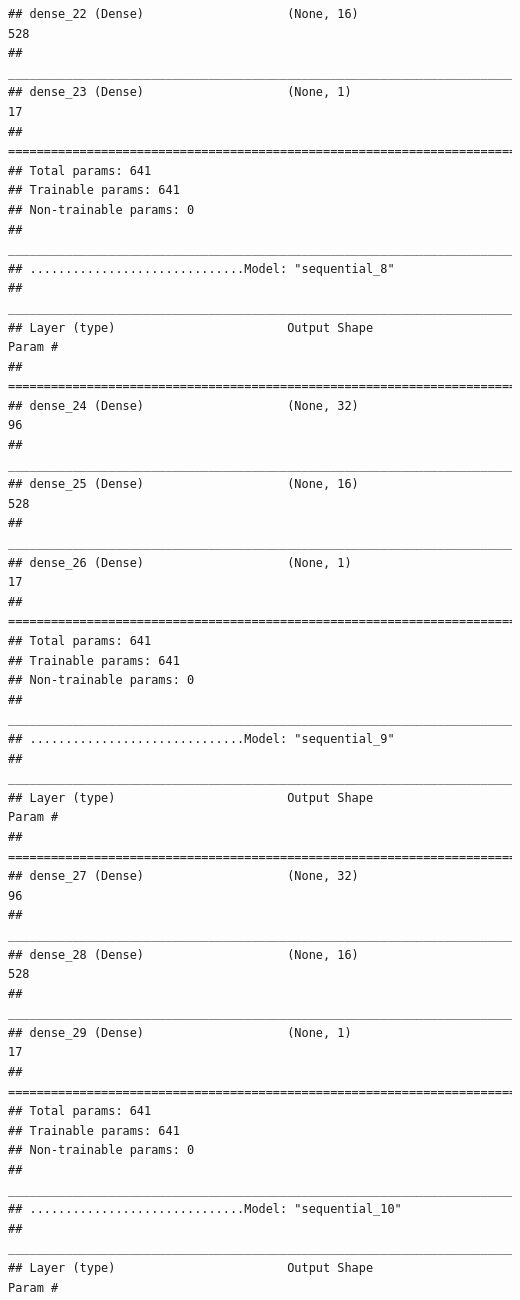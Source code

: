 \documentclass[
]{article}
\begin{document}
\begin{verbatim}
## dense_22 (Dense)                    (None, 16)                      528         
## ________________________________________________________________________________
## dense_23 (Dense)                    (None, 1)                       17          
## ================================================================================
## Total params: 641
## Trainable params: 641
## Non-trainable params: 0
## ________________________________________________________________________________
## ..............................Model: "sequential_8"
## ________________________________________________________________________________
## Layer (type)                        Output Shape                    Param #     
## ================================================================================
## dense_24 (Dense)                    (None, 32)                      96          
## ________________________________________________________________________________
## dense_25 (Dense)                    (None, 16)                      528         
## ________________________________________________________________________________
## dense_26 (Dense)                    (None, 1)                       17          
## ================================================================================
## Total params: 641
## Trainable params: 641
## Non-trainable params: 0
## ________________________________________________________________________________
## ..............................Model: "sequential_9"
## ________________________________________________________________________________
## Layer (type)                        Output Shape                    Param #     
## ================================================================================
## dense_27 (Dense)                    (None, 32)                      96          
## ________________________________________________________________________________
## dense_28 (Dense)                    (None, 16)                      528         
## ________________________________________________________________________________
## dense_29 (Dense)                    (None, 1)                       17          
## ================================================================================
## Total params: 641
## Trainable params: 641
## Non-trainable params: 0
## ________________________________________________________________________________
## ..............................Model: "sequential_10"
## ________________________________________________________________________________
## Layer (type)                        Output Shape                    Param #     

\end{verbatim}
\end{document}

